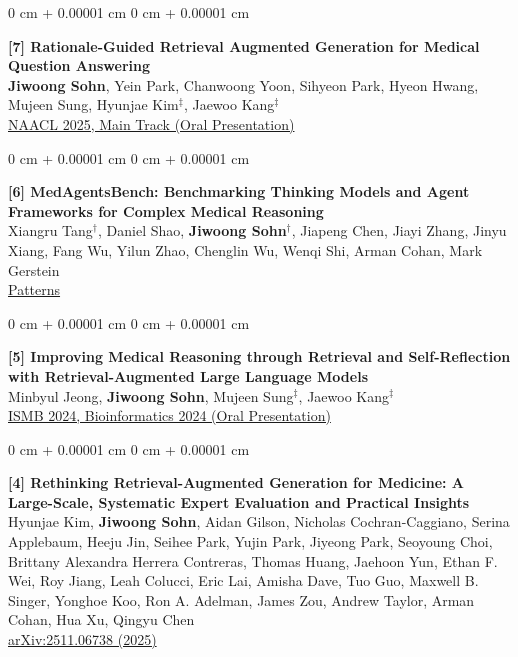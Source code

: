 \documentclass[11pt, letterpaper]{article}
\newenvironment{onecolentry}{
    \Needspace{3\baselineskip}
    \begin{adjustwidth}{
        0 cm + 0.00001 cm
    }{
        0 cm + 0.00001 cm
    }
}{
    \end{adjustwidth}
} %
\begin{document}
\begin{onecolentry}
    \textbf{[7] Rationale-Guided Retrieval Augmented Generation for Medical Question Answering} \\
    \textbf{Jiwoong Sohn}, Yein Park, Chanwoong Yoon, Sihyeon Park, Hyeon Hwang, Mujeen Sung, Hyunjae Kim$^{\ddagger}$, Jaewoo Kang$^{\ddagger}$ \\
    \href{https://aclanthology.org/2025.naacl-long.635/}{{NAACL 2025, Main Track (Oral Presentation)}}
\end{onecolentry}
\vspace{0.3 cm}

\begin{onecolentry}
    \textbf{[6] MedAgentsBench: Benchmarking Thinking Models and Agent Frameworks for Complex Medical Reasoning} \\
    Xiangru Tang$^{\dagger}$, Daniel Shao, \textbf{Jiwoong Sohn$^{\dagger}$}, Jiapeng Chen, Jiayi Zhang, Jinyu Xiang, Fang Wu, Yilun Zhao, Chenglin Wu, Wenqi Shi, Arman Cohan, Mark Gerstein \\
    \href{https://arxiv.org/abs/2503.07459}{{Patterns}}
\end{onecolentry}
\vspace{0.3 cm}

\begin{onecolentry}
    \textbf{[5] Improving Medical Reasoning through Retrieval and Self-Reflection with Retrieval-Augmented Large Language Models} \\
    Minbyul Jeong, \textbf{Jiwoong Sohn}, Mujeen Sung$^{\ddagger}$, Jaewoo Kang$^{\ddagger}$ \\
    \href{https://academic.oup.com/bioinformatics/article/40/Supplement_1/i119/7700892}{{ISMB 2024, Bioinformatics 2024 (Oral Presentation)}}
\end{onecolentry}
\vspace{0.3 cm}

\begin{onecolentry}
    \textbf{[4] Rethinking Retrieval-Augmented Generation for Medicine: A Large-Scale, Systematic Expert Evaluation and Practical Insights} \\
    Hyunjae Kim, \textbf{Jiwoong Sohn}, Aidan Gilson, Nicholas Cochran-Caggiano, Serina Applebaum, Heeju Jin, Seihee Park, Yujin Park, Jiyeong Park, Seoyoung Choi, Brittany Alexandra Herrera Contreras, Thomas Huang, Jaehoon Yun, Ethan F. Wei, Roy Jiang, Leah Colucci, Eric Lai, Amisha Dave, Tuo Guo, Maxwell B. Singer, Yonghoe Koo, Ron A. Adelman, James Zou, Andrew Taylor, Arman Cohan, Hua Xu, Qingyu Chen \\
    \href{https://arxiv.org/abs/2511.06738} {{arXiv:2511.06738 (2025)}} \\
\end{onecolentry}
\vspace{0.3 cm}
\end{document}
